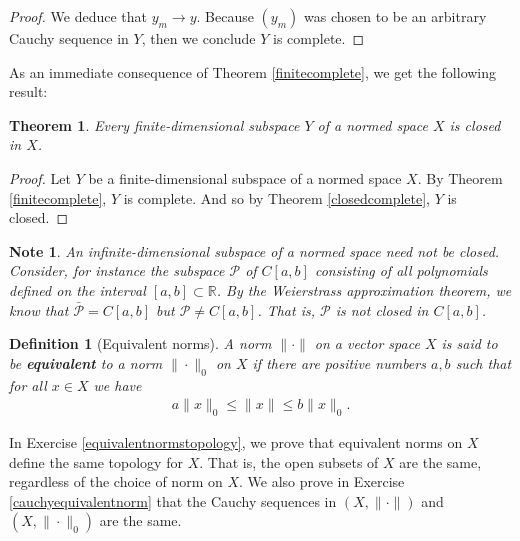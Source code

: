 \documentclass[11pt]{article}
\theoremstyle{mystyle}
\newtheorem{thm}{Theorem}[section]
\newtheorem{defn}{Definition}[section]
\newtheorem{note}{Note}[section]
\newcommand{\0}{\mathbf{0}}
\begin{document}
\begin{proof}
We deduce that $y_m \longrightarrow y$. Because $(y_m)$ was chosen to be an arbitrary Cauchy sequence in $Y$, then we conclude $Y$ is complete.
\end{proof}

As an immediate consequence of Theorem \ref{finitecomplete}, we get the following result:
\begin{thm}\label{finiteclosed}
Every finite-dimensional subspace $Y$ of a normed space $X$ is closed in $X$.
\end{thm}
\begin{proof}
Let $Y$ be a finite-dimensional subspace of a normed space $X$. By Theorem \ref{finitecomplete}, $Y$ is complete. And so by Theorem \ref{closedcomplete}, $Y$ is closed.
\end{proof}
\begin{note}
An infinite-dimensional subspace of a normed space need not be closed. Consider, for instance the subspace $\mathcal{P}$ of $C[a, b]$ consisting of all polynomials defined on the interval $[a, b] \subset \mathbb{R}$. By the Weierstrass approximation theorem, we know that $\bar{\mathcal{P}} = C[a, b]$ but $\mathcal{P} \neq C[a,b]$. That is, $\mathcal{P}$ is not closed in $C[a,b]$.
\end{note}

\begin{defn}[Equivalent norms]\label{equivalentnorms}
A norm $\|\cdot\|$ on a vector space $X$ is said to be \textbf{equivalent} to a norm $\|\cdot\|_0$ on $X$ if there are positive numbers $a, b$ such that for all $x \in X$ we have
\begin{align*}
    a\|x\|_0 \leq \|x\| \leq b\|x\|_0.
\end{align*}
\end{defn}
In Exercise \ref{equivalentnormstopology}, we prove that equivalent norms on $X$ define the same topology for $X$. That is, the open subsets of $X$ are the same, regardless of the choice of norm on $X$. We also prove in Exercise \ref{cauchyequivalentnorm} that the Cauchy sequences in $(X, \|\cdot\|)$ and $(X, \|\cdot\|_0)$ are the same.
\end{document}
